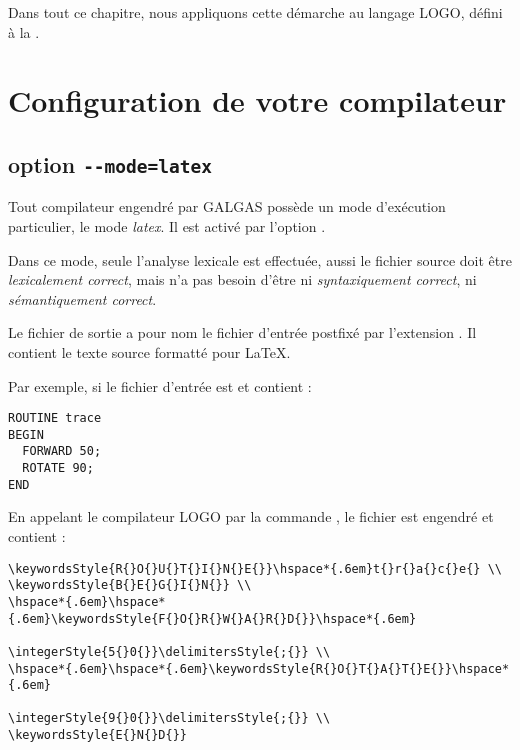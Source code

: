 Dans tout ce chapitre, nous appliquons cette démarche au langage LOGO, défini à la .





\section{Configuration de votre compilateur}

\subsection{option \texttt{-{}-mode=latex}}

Tout compilateur engendré par GALGAS possède un mode d'exécution particulier, le mode \emph{latex}. Il est activé par l'option .

Dans ce mode, seule l'analyse lexicale est effectuée, aussi le fichier source doit être \emph{lexicalement correct}, mais n'a pas besoin d'être ni \emph{syntaxiquement correct}, ni \emph{sémantiquement correct}.

Le fichier de sortie a pour nom le fichier d'entrée postfixé par l'extension . Il contient le texte source formatté pour \LaTeX.

Par exemple, si le fichier d'entrée est  et contient :

\begin{lstlisting}
ROUTINE trace
BEGIN
  FORWARD 50;
  ROTATE 90;
END
\end{lstlisting}

En appelant le compilateur LOGO par la commande , le fichier  est engendré et contient :

\begin{verbatim}
\keywordsStyle{R{}O{}U{}T{}I{}N{}E{}}\hspace*{.6em}t{}r{}a{}c{}e{} \\
\keywordsStyle{B{}E{}G{}I{}N{}} \\
\hspace*{.6em}\hspace*{.6em}\keywordsStyle{F{}O{}R{}W{}A{}R{}D{}}\hspace*{.6em}
                                       \integerStyle{5{}0{}}\delimitersStyle{;{}} \\
\hspace*{.6em}\hspace*{.6em}\keywordsStyle{R{}O{}T{}A{}T{}E{}}\hspace*{.6em}
                                       \integerStyle{9{}0{}}\delimitersStyle{;{}} \\
\keywordsStyle{E{}N{}D{}}
\end{verbatim}

